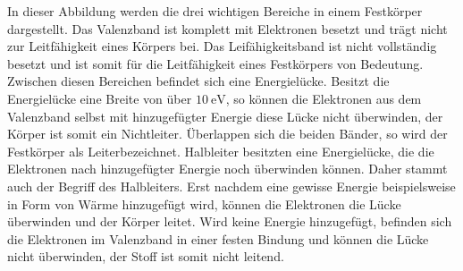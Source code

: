 In dieser Abbildung werden die drei wichtigen Bereiche in einem Festkörper
dargestellt. Das Valenzband ist komplett mit Elektronen besetzt und trägt nicht
zur Leitfähigkeit eines Körpers bei. Das Leifähigkeitsband ist nicht
vollständig besetzt und ist somit für die Leitfähigkeit eines Festkörpers von
Bedeutung. Zwischen diesen Bereichen befindet sich eine Energielücke. Besitzt
die Energielücke eine Breite von über $\SI{10}{\electronvolt}$, so können die
Elektronen aus dem Valenzband selbst mit hinzugefügter Energie diese Lücke nicht
überwinden, der Körper ist somit ein Nichtleiter. Überlappen sich die beiden
Bänder, so wird der Festkörper als Leiterbezeichnet. Halbleiter besitzten eine
Energielücke, die die Elektronen nach hinzugefügter Energie noch überwinden
können. Daher stammt auch der Begriff des Halbleiters. Erst nachdem eine
gewisse Energie beispielsweise in Form von Wärme hinzugefügt wird, können die
Elektronen die Lücke überwinden und der Körper leitet. Wird keine Energie
hinzugefügt, befinden sich die Elektronen im Valenzband in einer festen Bindung
und können die Lücke nicht überwinden, der Stoff ist somit nicht leitend.
